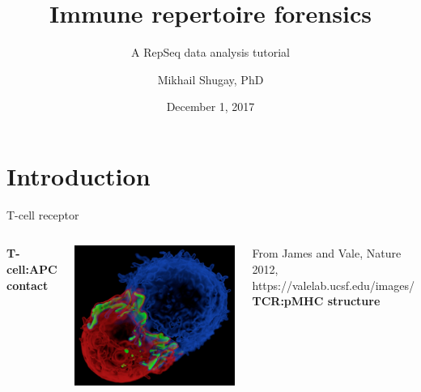 \documentclass[12pt]{beamer}
\author{Mikhail Shugay, PhD}
\title{Immune repertoire forensics}
\subtitle{A RepSeq data analysis tutorial}
\institute[Skoltech]{\texttt {Skoltech, MA03172 course [Term 2, 2017-2018]}}
\date{December 1, 2017}
\begin{document}
\maketitle

\section{Introduction}
\begin{frame}{T-cell receptor}
\begin{columns}
\textbf{T-cell:APC contact}\\~\

\includegraphics[scale=0.13]{p1}\\~\

From James and Vale, Nature 2012, https://valelab.ucsf.edu/images/
\pause
{}
\textbf{TCR:pMHC structure}\\~\


\end{columns}
\end{frame}
\end{document}
